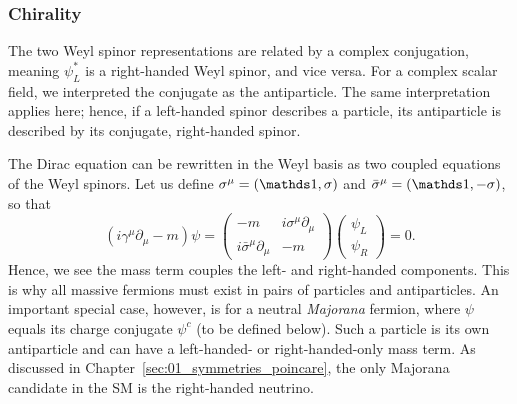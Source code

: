 \subsubsection{Chirality}

The two Weyl spinor representations are related by a complex conjugation, meaning $\psi_L^*$ is a right-handed Weyl spinor, and vice versa.
For a complex scalar field, we interpreted the conjugate as the antiparticle.
The same interpretation applies here; hence, if a left-handed spinor describes a particle, its antiparticle is described by its conjugate, right-handed spinor.

The Dirac equation can be rewritten in the Weyl basis as two coupled equations of the Weyl spinors.
Let us define $\sigma^\mu = (\identity, \cvec{\sigma})$ and $\bar{\sigma}^\mu = (\identity, -\cvec{\sigma})$, so that
\begin{equation}
	\label{eq:01_qft_spinors_dirac_weyl}
	(i\gamma^\mu\partial_\mu - m)\psi =
	\begin{pmatrix}
		-m & i\sigma^\mu\partial_\mu \\ i\bar{\sigma}^\mu\partial_\mu & -m
	\end{pmatrix}
	\begin{pmatrix} \psi_L \\ \psi_R \end{pmatrix} = 0.
\end{equation}
Hence, we see the mass term couples the left- and right-handed components.
This is why all massive fermions must exist in pairs of particles and antiparticles.
An important special case, however, is for a neutral \textit{Majorana} fermion, where $\psi$ equals its charge conjugate $\psi^c$ (to be defined below).
Such a particle is its own antiparticle and can have a left-handed- or right-handed-only mass term.
As discussed in Chapter~\ref{sec:01_symmetries_poincare}, the only Majorana candidate in the SM is the right-handed neutrino.

